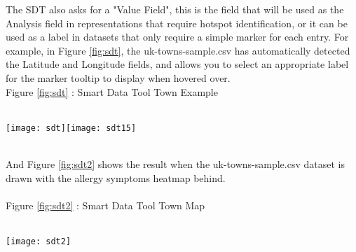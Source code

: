 The SDT also asks for a "Value Field", this is the field that will be used as the Analysis field in representations that require hotspot identification, or it can be used as a label in datasets that only require a simple marker for each entry. For example, in Figure \ref{fig:sdt}, the uk-towns-sample.csv has automatically detected the Latitude and Longitude fields, and allows you to select an appropriate label for the marker tooltip to display when hovered over.\\

\caption{Figure \ref{fig:sdt} : Smart Data Tool Town Example\label{fig:sdt}}\\
\centering
\texttt{[image: sdt]}\texttt{[image: sdt15]}
\centering

\\And Figure \ref{fig:sdt2} shows the result when the uk-towns-sample.csv dataset is drawn with the allergy symptoms heatmap behind.\\\\

\caption{Figure \ref{fig:sdt2} : Smart Data Tool Town Map\label{fig:sdt2}}\\
\centering
\texttt{[image: sdt2]}
\centering